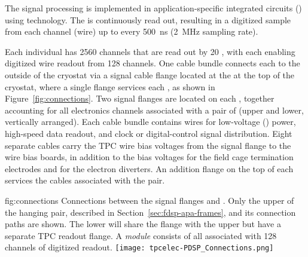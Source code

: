 The  signal processing is implemented in application-specific integrated circuits ()
using  technology.  The  is continuously read out, resulting in a digitized 
sample from each  channel (wire) up to every \SI{500}{ns} (\SI{2}{MHz} sampling rate).

Each individual  has \num{2560} channels that are read out by \num{20} %
, with
each  enabling digitized wire readout from \num{128} channels.  One cable bundle connects each  to
the outside of the cryostat via a  signal cable flange located at the  \fdth at the
top of the cryostat, where a single flange services each , as shown in Figure~\ref{fig:connections}.  Two  signal flanges are located on each \fdth, together accounting for all electronics channels associated with a pair of  (upper and lower, vertically arranged).
Each cable bundle contains wires for low-voltage () power, high-speed data readout, and
clock or digital-control signal distribution.  Eight separate cables carry the TPC wire bias voltages
from the signal flange to the  wire bias boards, in addition to the bias voltages for the field
cage termination electrodes and for the electron diverters.  An addition flange on the top of each \fdth services the  cables associated with the  pair.

\begin{dunefigure}
{fig:connections}
{Connections between the signal flanges and . Only the upper  of the hanging  pair, described in Section~\ref{sec:fdsp-apa-frames}, and its connection paths are shown. The lower  will share the  flange with the upper  but have a separate TPC readout flange. A \textit{ module} consists of all  associated with \num{128} channels of digitized readout.}
\texttt{[image: tpcelec-PDSP\_Connections.png]}
\end{dunefigure}

